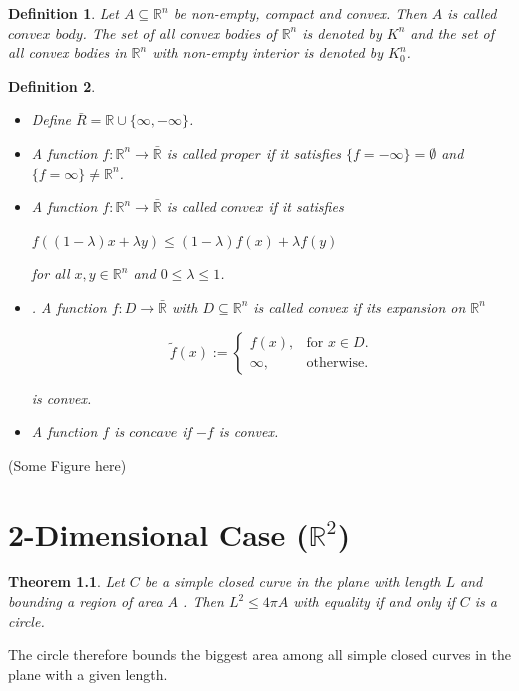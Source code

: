 \documentclass[a4paper]{book}
\newtheorem{theorem}{Theorem}%
\newtheorem{definition}{Definition}%
\begin{document}
\begin{definition}
	Let $A\subseteq\mathbb{R}^n$ be non-empty, compact and convex. Then $A$ is called $convex$ $body$. The set of all convex bodies of $\mathbb{R}^n$ is denoted by $K^n$ and the set of all convex bodies in $\mathbb{R}^n$ with non-empty interior is denoted by $K_{0}^{n}$.
\end{definition}

\begin{definition}
	\begin{itemize}
		\item Define $\bar{R}=\mathbb{R}\cup\{ \infty,-\infty\}$.
		\item A function $f:\mathbb{R}^n\to\bar{\mathbb{R}}$ is called $proper$ if it satisfies $\{f=-\infty\}=\emptyset$ and $\{f=\infty\}\neq\mathbb{R}^n$.
		\item A function $f:\mathbb{R}^n\to\bar{\mathbb{R}}$ is called $convex$ if it satisfies 
		\begin{center}
			$f((1-\lambda)x+\lambda y)\leq(1-\lambda)f(x)+\lambda f(y)$
		\end{center}
		for all $x, y\in\mathbb{R}^n$ and $0\leq\lambda\leq1$.
		\item . A function $f:D\to\bar{\mathbb{R}}$ with $D\subseteq\mathbb{R}^n$ is called convex if its expansion on $\mathbb{R}^n$
		\begin{center}
			\begin{equation}
				  \tilde{f}(x):=\begin{cases}
				    	f(x), & \text{for $x\in D$}.\\
				   	 \infty, & \text{otherwise}.
				  \end{cases}
			\end{equation}
		\end{center}
		is convex.
		\item A function $f$ is $concave$ if $-f$ is convex.
	\end{itemize}
\end{definition}
(Some Figure here)

\chapter{2-Dimensional Case ($\mathbb{R}^2$)}
\begin{theorem}
    Let $C$ be a simple closed curve in the plane with length $L$ and bounding a region of area $A$ . 
    Then $L^2 \leq 4\pi A$ with equality if and only if $C$ is a circle.
\end{theorem}
The circle therefore bounds the biggest area among all simple closed curves in the plane with a given length.
\end{document}
